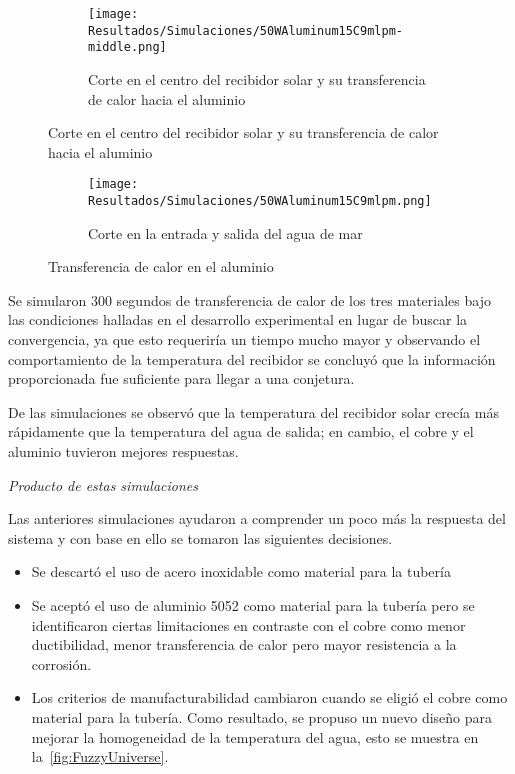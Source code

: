 				\begin{figure}[H]
					\centering
					\begin{subfigure}[t]{\linewidth}
						\centering
						\texttt{[image: Resultados/Simulaciones/50WAluminum15C9mlpm-middle.png]}
						\caption{Corte en el centro del recibidor solar y su transferencia de calor hacia el aluminio}
						\label{fig:50WAluminum15C9mlpm-middle}
					\end{subfigure}
				\end{figure}

				\begin{figure}[H]\ContinuedFloat
					\begin{subfigure}[t]{\linewidth}
						\centering
						\texttt{[image: Resultados/Simulaciones/50WAluminum15C9mlpm.png]}
						\caption{Corte en la entrada y salida del agua de mar}
						\label{fig:50WAluminum15C9mlpm}
					\end{subfigure}
					\hfill
					\caption{Transferencia de calor en el aluminio}
					\label{fig:aluminum-heat-transfer}
				\end{figure}
				
				Se simularon 300 segundos de transferencia de calor de los tres materiales bajo las condiciones halladas en el desarrollo experimental en lugar de buscar la convergencia, ya que esto requeriría un tiempo mucho mayor y observando el comportamiento de la temperatura del recibidor se concluyó que la información proporcionada fue suficiente para llegar a una conjetura.
				
				De las simulaciones se observó que la temperatura del recibidor solar crecía más rápidamente que la temperatura del agua de salida; en cambio, el cobre y el aluminio tuvieron mejores respuestas.
				
				\textit{Producto de estas simulaciones}
				
				Las anteriores simulaciones ayudaron a comprender un poco más la respuesta del sistema y con base en ello se tomaron las siguientes decisiones.
				
				\begin{itemize}
					\item Se descartó el uso de acero inoxidable como material para la tubería
					\item Se aceptó el uso de aluminio 5052 como material para la tubería pero se identificaron ciertas limitaciones en contraste con el cobre como menor ductibilidad, menor transferencia de calor pero mayor resistencia a la corrosión.
					\item Los criterios de manufacturabilidad cambiaron cuando se eligió el cobre como material para la tubería. Como resultado, se propuso un nuevo diseño para mejorar la homogeneidad de la temperatura del agua, esto se muestra en la~\cref{fig:FuzzyUniverse}.
				\end{itemize}
				
